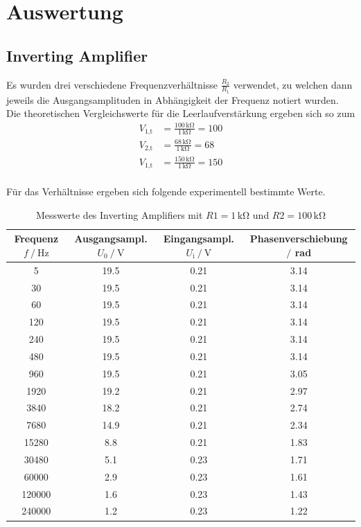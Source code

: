 \section{Auswertung}
\label{sec:Auswertung}


 
\subsection{Inverting Amplifier}
\label{sec:InvertinAmpl}
 
Es wurden drei verschiedene Frequenzverhältnisse $\frac{R_2}{R_1}$ verwendet, zu welchen dann jeweils die Ausgangsamplituden in Abhängigkeit der Frequenz notiert wurden.
Die theoretischen Vergleichswerte für die Leerlaufverstärkung ergeben sich so zum
\begin{align*}
    V_{\text{1,t}} &= \frac{100\,\unit{\kilo\ohm}}{1\,\unit{\kilo\ohm}} =100\\
    V_{\text{2,t}} &= \frac{68\,\unit{\kilo\ohm}}{1\,\unit{\kilo\ohm}} =68\\
    V_{\text{1,t}} &= \frac{150\,\unit{\kilo\ohm}}{1\,\unit{\kilo\ohm}} =150\\
\end{align*}

Für das Verhältnisse ergeben sich folgende experimentell bestimmte Werte.
\begin{table}
    \centering
    \caption{Messwerte des Inverting Amplifiers mit $R1=1\,\unit{\kilo\ohm}$ und $R2=100\,\unit{\kilo\ohm}$}
    \begin{tabular}{c c c c}
        \toprule
        Frequenz $f\mathbin{/}\unit{\hertz}$ & Ausgangsampl. $U_0\mathbin{/}\unit{\volt}$& Eingangsampl. $U_{\text{i}}\mathbin{/}\unit{\volt}$ & Phasenverschiebung $\mathbin{/}$ rad\\
        \midrule
        5	&19.5	&0.21&	3.14\\
        30&	19.5	&0.21&	3.14\\
        60&	19.5	&0.21&	3.14\\
        120&	19.5&	0.21&	3.14\\
        240&	19.5&	0.21&	3.14\\
        480	&19.5	&0.21&	3.14\\
        960	&19.5	&0.21&	3.05\\
        1920&	19.2&	0.21&	2.97\\
        3840&	18.2&	0.21&	2.74\\
        7680&	14.9&	0.21&	2.34\\
        15280&	8.8&	0.21&	1.83\\
        30480&	5.1	&0.23& 1.71\\
        60000&	2.9	&0.23&	1.61\\
        120000&	1.6	&0.23&	1.43\\
        240000&	1.2	&0.23&	1.22\\
        \bottomrule
    \end{tabular}
    \label{tab:InvAmp1}
\end{table}

